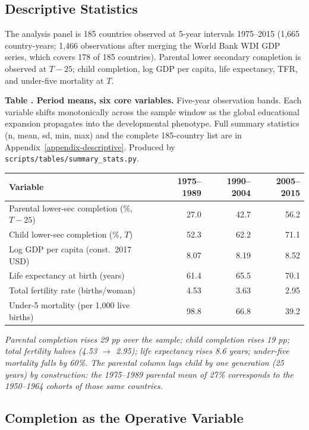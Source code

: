 \documentclass[12pt,letterpaper]{article}
\begin{document}
\subsection{Descriptive Statistics}\label{descriptive-statistics}

The analysis panel is 185 countries observed at 5-year intervals
1975--2015 (1{,}665 country-years; 1{,}466 observations after merging
the World Bank WDI GDP series, which covers 178 of 185 countries).
Parental lower secondary completion is observed at $T{-}25$; child
completion, log GDP per capita, life expectancy, TFR, and under-five
mortality at $T$.

\label{tab:summary}\textbf{Table \thetable. Period means, six core variables.}
Five-year observation bands. Each variable shifts monotonically across
the sample window as the global educational expansion propagates into
the developmental phenotype. Full summary statistics (n, mean, sd, min,
max) and the complete 185-country list are in
Appendix~\ref{appendix-descriptive}. Produced by
\texttt{scripts/tables/summary\_stats.py}.

{\small
\begin{longtable}[]{@{}lrrr@{}}
\toprule
Variable & 1975--1989 & 1990--2004 & 2005--2015 \\
\midrule
\endhead
Parental lower-sec completion (\%, $T{-}25$) & 27.0 & 42.7 & 56.2 \\
Child lower-sec completion (\%, $T$)          & 52.3 & 62.2 & 71.1 \\
Log GDP per capita (const.\ 2017 USD)         &  8.07 &  8.19 &  8.52 \\
Life expectancy at birth (years)              & 61.4 & 65.5 & 70.1 \\
Total fertility rate (births/woman)           &  4.53 &  3.63 &  2.95 \\
Under-5 mortality (per 1{,}000 live births)   & 98.8 & 66.8 & 39.2 \\
\bottomrule
\end{longtable}
}

\emph{Parental completion rises 29 pp over the sample; child completion
rises 19 pp; total fertility halves (4.53 $\to$ 2.95); life expectancy
rises 8.6 years; under-five mortality falls by 60\%. The parental
column lags child by one generation (25 years) by construction: the
1975--1989 parental mean of 27\% corresponds to the 1950--1964 cohorts
of those same countries.}

\subsection{Completion as the Operative Variable}\label{completion-as-the-operative-variable}
\end{document}

